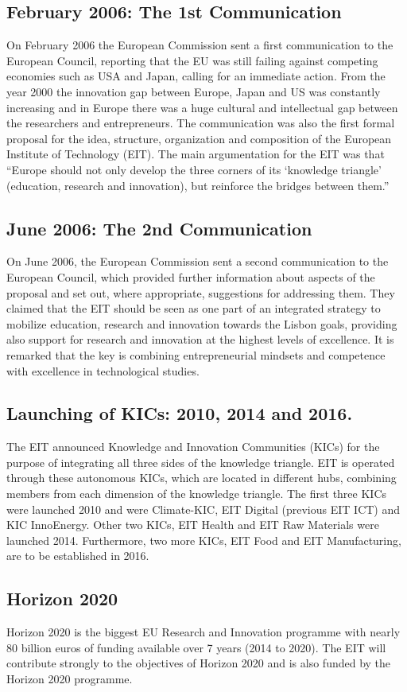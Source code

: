 \documentclass[11pt,a4paper,oneside,twocolumn]{IEEEtran}
\begin{document}
\subsection{February 2006: The 1st Communication}
On February 2006 the European Commission sent a first communication to the European Council, reporting that the EU was still failing against competing economies such as USA and Japan, calling for an immediate action. From the year 2000 the innovation gap between Europe, Japan and US was constantly increasing and in Europe there was a huge cultural and intellectual gap between the researchers and entrepreneurs\cite{3_4}.
The communication was also the first formal proposal for the idea, structure, organization and composition of the European Institute of Technology (EIT). The main argumentation for the EIT was that “Europe should not only develop the three corners of its ‘knowledge triangle’ (education, research and innovation), but reinforce the bridges between them.''\cite{3_4}

\subsection{June 2006: The 2nd Communication}
On June 2006, the European Commission sent a second communication to the European Council, which provided further information about aspects of the proposal and set out, where appropriate, suggestions for addressing them. They claimed that the EIT should be seen as one part of an integrated strategy to mobilize education, research and innovation towards the Lisbon goals, providing also support for research and innovation at the highest levels of excellence. It is remarked that the key is combining entrepreneurial mindsets and competence with excellence in technological studies\cite{3_5}.

\subsection{Launching of KICs: 2010, 2014 and 2016.}
The EIT announced Knowledge and Innovation Communities (KICs) for the purpose of integrating all three sides of the knowledge triangle. EIT is operated through these autonomous KICs, which are located in different hubs, combining members from each dimension of the knowledge triangle. The first three KICs were launched 2010 and were Climate-KIC, EIT Digital (previous EIT ICT) and KIC InnoEnergy. Other two KICs, EIT Health and EIT Raw Materials were launched 2014. Furthermore, two more KICs, EIT Food and EIT Manufacturing, are to be established in 2016\cite{3_8}.

\subsection{Horizon 2020}
Horizon 2020 is the biggest EU Research and Innovation programme with nearly 80 billion euros of funding available over 7 years (2014 to 2020)\cite{3_6}. The EIT will contribute strongly to the objectives of Horizon 2020 and is also funded by the Horizon 2020 programme\cite{3_7}.








\end{document}
